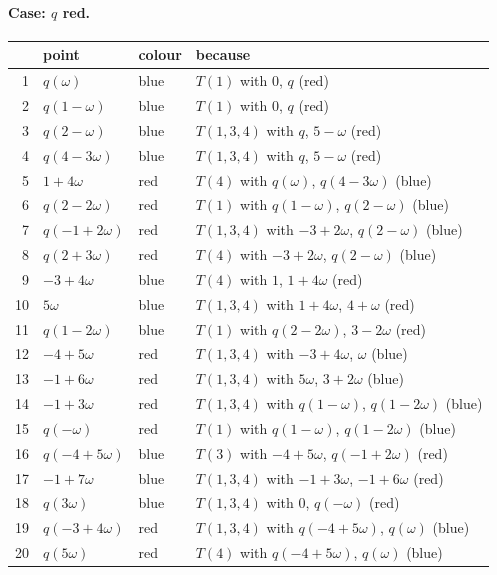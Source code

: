 \paragraph{Case: $q$ red.}
\begin{center}\small\begin{longtable}{rlll}\toprule & point & colour & because\\\midrule\endhead
1 & $q(\omega)$ & blue & $T(1)$ with $0$, $q$ (red)\\
2 & $q(1-\omega)$ & blue & $T(1)$ with $0$, $q$ (red)\\
3 & $q(2-\omega)$ & blue & $T(1,3,4)$ with $q$, $5-\omega$ (red)\\
4 & $q(4-3\omega)$ & blue & $T(1,3,4)$ with $q$, $5-\omega$ (red)\\
5 & $1+4\omega$ & red & $T(4)$ with $q(\omega)$, $q(4-3\omega)$ (blue)\\
6 & $q(2-2\omega)$ & red & $T(1)$ with $q(1-\omega)$, $q(2-\omega)$ (blue)\\
7 & $q(-1+2\omega)$ & red & $T(1,3,4)$ with $-3+2\omega$, $q(2-\omega)$ (blue)\\
8 & $q(2+3\omega)$ & red & $T(4)$ with $-3+2\omega$, $q(2-\omega)$ (blue)\\
9 & $-3+4\omega$ & blue & $T(4)$ with $1$, $1+4\omega$ (red)\\
10 & $5\omega$ & blue & $T(1,3,4)$ with $1+4\omega$, $4+\omega$ (red)\\
11 & $q(1-2\omega)$ & blue & $T(1)$ with $q(2-2\omega)$, $3-2\omega$ (red)\\
12 & $-4+5\omega$ & red & $T(1,3,4)$ with $-3+4\omega$, $\omega$ (blue)\\
13 & $-1+6\omega$ & red & $T(1,3,4)$ with $5\omega$, $3+2\omega$ (blue)\\
14 & $-1+3\omega$ & red & $T(1,3,4)$ with $q(1-\omega)$, $q(1-2\omega)$ (blue)\\
15 & $q(-\omega)$ & red & $T(1)$ with $q(1-\omega)$, $q(1-2\omega)$ (blue)\\
16 & $q(-4+5\omega)$ & blue & $T(3)$ with $-4+5\omega$, $q(-1+2\omega)$ (red)\\
17 & $-1+7\omega$ & blue & $T(1,3,4)$ with $-1+3\omega$, $-1+6\omega$ (red)\\
18 & $q(3\omega)$ & blue & $T(1,3,4)$ with $0$, $q(-\omega)$ (red)\\
19 & $q(-3+4\omega)$ & red & $T(1,3,4)$ with $q(-4+5\omega)$, $q(\omega)$ (blue)\\
20 & $q(5\omega)$ & red & $T(4)$ with $q(-4+5\omega)$, $q(\omega)$ (blue)\\

\end{longtable}
\end{center}
